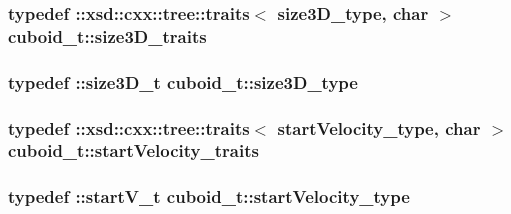 \hypertarget{classcuboid__t_a8f449274f0802c092d0abd4f45ea1cdc}{
\subsubsection[{size3\-D\-\_\-traits}]{\setlength{\rightskip}{0pt plus 5cm}typedef \-::xsd\-::cxx\-::tree\-::traits$<$ {\bf size3\-D\-\_\-type}, char $>$ {\bf cuboid\-\_\-t\-::size3\-D\-\_\-traits}}}\label{classcuboid__t_a8f449274f0802c092d0abd4f45ea1cdc}
\hypertarget{classcuboid__t_abf130ab4ed6d70047bb193a41283ec28}{
\subsubsection[{size3\-D\-\_\-type}]{\setlength{\rightskip}{0pt plus 5cm}typedef \-::{\bf size3\-D\-\_\-t} {\bf cuboid\-\_\-t\-::size3\-D\-\_\-type}}}\label{classcuboid__t_abf130ab4ed6d70047bb193a41283ec28}
\hypertarget{classcuboid__t_a0d43837eb6423a21e59b6f36012b244a}{
\subsubsection[{start\-Velocity\-\_\-traits}]{\setlength{\rightskip}{0pt plus 5cm}typedef \-::xsd\-::cxx\-::tree\-::traits$<$ {\bf start\-Velocity\-\_\-type}, char $>$ {\bf cuboid\-\_\-t\-::start\-Velocity\-\_\-traits}}}\label{classcuboid__t_a0d43837eb6423a21e59b6f36012b244a}
\hypertarget{classcuboid__t_a7b9bd2a7888abc4b08f6f4e91ac9a81f}{
\subsubsection[{start\-Velocity\-\_\-type}]{\setlength{\rightskip}{0pt plus 5cm}typedef \-::{\bf start\-V\-\_\-t} {\bf cuboid\-\_\-t\-::start\-Velocity\-\_\-type}}}\label{classcuboid__t_a7b9bd2a7888abc4b08f6f4e91ac9a81f}


